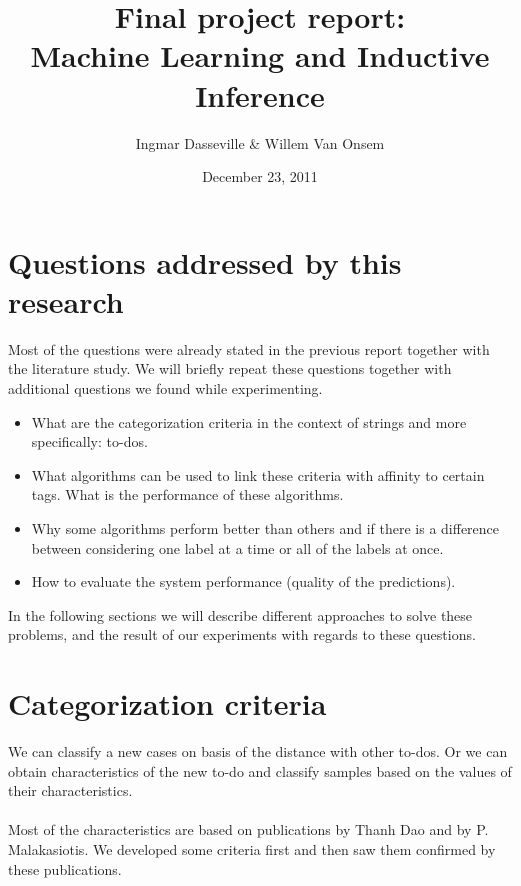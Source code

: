 \documentclass[a4paper,titlepage]{article}
\title{Final project report:\\Machine Learning and Inductive Inference}
\author{Ingmar Dasseville \& Willem Van Onsem}
\date{December 23, 2011}
\begin{document}
\begin{titlepage}
\maketitle
\end{titlepage}
\tableofcontents
\newpage
\section{Questions addressed by this research}
Most of the questions were already stated in the previous report together with the literature study. We will briefly repeat these questions together with additional questions we found while experimenting.
\begin{itemize}
 \item What are the categorization criteria in the context of strings and more specifically: to-dos.
 \item What algorithms can be used to link these criteria with affinity to certain tags. What is the performance of these algorithms.
 \item Why some algorithms perform better than others and if there is a difference between considering one label at a time or all of the labels at once.
 \item How to evaluate the system performance (quality of the predictions).
\end{itemize}
In the following sections we will describe different approaches to solve these problems, and the result of our experiments with regards to these questions.
\section{Categorization criteria}
We can classify a new cases on basis of the distance with other to-dos. Or we can obtain characteristics of the new to-do and classify samples based on the values of their characteristics.
\paragraph{}
Most of the characteristics are based on publications \cite{codeproject2,codeproject1} by Thanh Dao and \cite{Malakasiotis:2007:LTE:1654536.1654547} by P. Malakasiotis. We developed some criteria first and then saw them confirmed by these publications.
\end{document}
